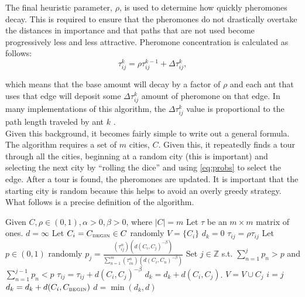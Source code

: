 \documentclass[twocolumn]{article}
\begin{document}
The final heuristic parameter, $\rho$, is used to 
determine how quickly pheromones decay. This is required to ensure that the pheromones do not
drastically overtake the distances in importance and that paths that are not used become 
progressively less and less attractive. Pheromone concentration is calculated as follows:
\begin{equation}
\tau^k_{ij} = \rho \tau^{k-1}_{ij} + \Delta \tau^k_{ij}, \label{eq:phers}
\end{equation}

which means that the base amount will decay by a factor of $\rho$ and each ant
that uses that edge will deposit some $\Delta\tau^k_{ij}$ amount of pheromone on
that edge. In many implementations of this algorithm, the $\Delta\tau^k_{ij}$
value is proportional to the path length traveled by ant $k$ \cite{iridia:aco} 
\cite{ipcsit:aco} \cite{jungblut:aco}. \\ 

Given this background, it becomes fairly simple to write out a general 
formula. The algorithm requires a set of $m$ cities, $C$. Given this, 
it repeatedly finds a tour through all the cities, beginning at a random city
(this is important) and selecting the next city by ``rolling the dice'' and
using \eqref{eq:probs} to select the edge. After a tour is found, the 
pheromones are updated. It is important that the starting city is random 
because this helps to avoid an overly greedy strategy. What follows is a
precise definition of the algorithm. \\

\begin{algorithmic}
  \State Given $C, \rho \in (0,1), \alpha > 0, \beta > 0$, where $|C| = m$
  \State Let $\tau$ be an $m \times m$ matrix of ones.
  \State $d = \infty$
    \State Let $C_i = C_{\mbox{{\tiny BEGIN}}}\in C$ randomly
    \State $V = \{ C_i \}$
    \State $d_k = 0$
    \State $\tau_{ij} = \rho \tau_{ij}$
       \State Let $p \in (0,1)$ randomly
       \State $\displaystyle p_j = \frac{(\tau_{ij}^\alpha)(d(C_i,C_j)^{-\beta})}{\sum_{n=1}^m 
         (\tau_{in}^\alpha) (d(C_i,C_n)^{-\beta})}$
       \State Set $j \in \mathbb{Z}$ s.t. $\displaystyle \sum_{n=1}^j p_n > p$ and 
       $\displaystyle \sum_{n=1}^{j-1} p_n < p$
       \State $\tau_{ij} = \tau_{ij} + d(C_i,C_j)^{-\beta}$
       \State $d_k = d_k + d(C_i,C_j)$.
       \State $V = V \cup C_j$
       \State $i = j$
    \EndWhile
    \State $d_k = d_k + d(C_i,C_{\mbox{{\tiny BEGIN}}})$
    \State $d = \min (d_k, d)$
  \EndFor \\
\end{algorithmic}
\end{document}
